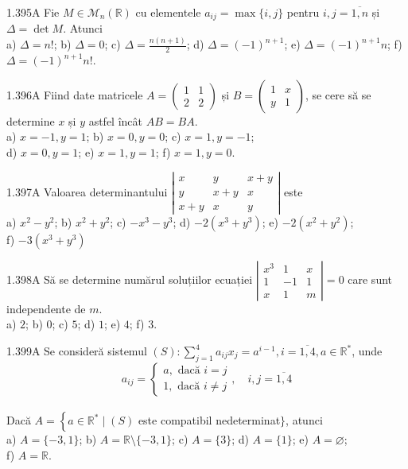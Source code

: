 \documentclass[11pt]{article}
\begin{document}
1.395A Fie $M \in \mathcal{M}_{n}(\mathbb{R})$ cu elementele $a_{i j}=\max \{i, j\}$ pentru $i, j=\overline{1, n}$ și $\Delta=\operatorname{det} M$. Atunci\\ a) $\Delta=n!$; b) $\Delta=0$; c) $\Delta=\frac{n(n+1)}{2}$; d) $\Delta=(-1)^{n+1}$; e) $\Delta=(-1)^{n+1} n$; f) $\Delta=(-1)^{n+1} n!$.

1.396A Fiind date matricele $A=\left(\begin{array}{ll}1 & 1 \\ 2 & 2\end{array}\right)$ și $B=\left(\begin{array}{ll}1 & x \\ y & 1\end{array}\right)$, se cere să se determine $x$ și $y$ astfel încât $A B=B A$.\\ a) $x=-1, y=1$; b) $x=0, y=0$; c) $x=1, y=-1$;\\ d) $x=0, y=1$; e) $x=1, y=1$; f) $x=1, y=0$.

1.397A Valoarea determinantului $\left|\begin{array}{ccc}x & y & x+y \\ y & x+y & x \\ x+y & x & y\end{array}\right|$ este\\ a) $x^{2}-y^{2}$; b) $x^{2}+y^{2}$; c) $-x^{3}-y^{3}$; d) $-2\left(x^{3}+y^{3}\right)$; e) $-2\left(x^{2}+y^{2}\right)$;\\ f) $-3\left(x^{3}+y^{3}\right)$

1.398A Să se determine numărul soluțiilor ecuației $\left|\begin{array}{ccc}x^{3} & 1 & x \\ 1 & -1 & 1 \\ x & 1 & m\end{array}\right|=0$ care sunt independente de $m$.\\ a) $2$; b) $0$; c) $5$; d) $1$; e) $4$; f) $3$.

1.399A Se consideră sistemul $(S): \sum_{j=1}^{4} a_{i j} x_{j}=a^{i-1}, i=\overline{1,4}, a \in \mathbb{R}^{*}$, unde $$a_{i j}=\left\{\begin{array}{l}a, \text { dacă } i=j \\1, \text { dacă } i \neq j\end{array}, \quad i, j=\overline{1,4}\right.$$\\ Dacă $A=\left\{a \in \mathbb{R}^{*} \mid(S)\right.$ este compatibil nedeterminat$\}$, atunci\\ a) $A=\{-3,1\}$; b) $A=\mathbb{R} \setminus\{-3,1\}$; c) $A=\{3\}$; d) $A=\{1\}$; e) $A=\varnothing$;\\ f) $A=\mathbb{R}$.
\end{document}
